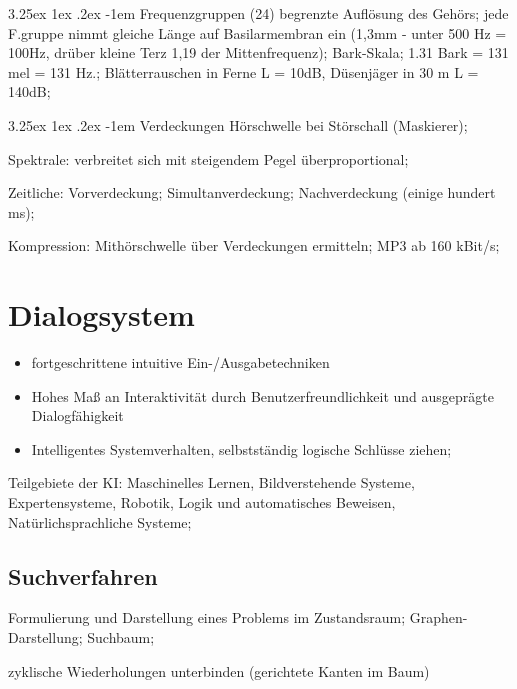 \documentclass[german,color,6pt]{latex4ei/latex4ei_sheet}
\makeatletter
\renewcommand\paragraph{\@startsection{paragraph}{4}{\z@}%
                                    {3.25ex \@plus1ex \@minus.2ex}%
                                    {-1em}%
                                    {\normalfont\normalsize\bfseries}}
\makeatother
\begin{document}
\begin{sectionbox}
\paragraph{Frequenzgruppen} (24) begrenzte Auflösung des Gehörs; jede F.gruppe nimmt gleiche Länge auf Basilarmembran ein (1,3mm - unter 500 Hz = 100Hz, drüber kleine Terz 1,19 der Mittenfrequenz); Bark-Skala; 1.31 Bark = 131 mel = 131 Hz.; Blätterrauschen in Ferne L = 10dB, Düsenjäger in 30 m L = 140dB;

\paragraph{Verdeckungen} Hörschwelle bei Störschall (Maskierer);

Spektrale: verbreitet sich mit steigendem Pegel überproportional;

Zeitliche: Vorverdeckung; Simultanverdeckung; Nachverdeckung (einige hundert ms);

Kompression: Mithörschwelle über Verdeckungen ermitteln; MP3 ab 160 kBit/s;
\end{sectionbox}

\section{Dialogsystem}
\begin{symbolbox}
\begin{itemize}
	\item fortgeschrittene intuitive Ein-/Ausgabetechniken
	\item Hohes Maß an Interaktivität durch Benutzerfreundlichkeit und ausgeprägte Dialogfähigkeit
	\item Intelligentes Systemverhalten, selbstständig logische Schlüsse ziehen;
\end{itemize}
\end{symbolbox}
Teilgebiete der KI: Maschinelles Lernen, Bildverstehende Systeme, Expertensysteme, Robotik, Logik und automatisches Beweisen, Natürlichsprachliche Systeme;

\subsection{Suchverfahren}
\begin{symbolbox}
Formulierung und Darstellung eines Problems im Zustandsraum; Graphen-Darstellung; Suchbaum;
\end{symbolbox}

\begin{emphbox}
 zyklische Wiederholungen unterbinden (gerichtete Kanten im Baum)
\end{emphbox}
\end{document}
